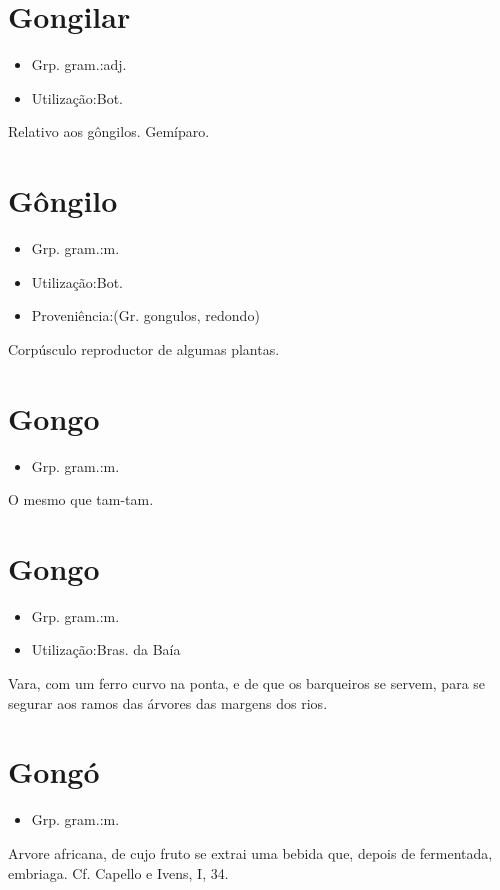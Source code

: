 \section{Gongilar}
\begin{itemize}
\item {Grp. gram.:adj.}
\end{itemize}
\begin{itemize}
\item {Utilização:Bot.}
\end{itemize}
Relativo aos gôngilos.
Gemíparo.
\section{Gôngilo}
\begin{itemize}
\item {Grp. gram.:m.}
\end{itemize}
\begin{itemize}
\item {Utilização:Bot.}
\end{itemize}
\begin{itemize}
\item {Proveniência:(Gr. \textunderscore gongulos\textunderscore , redondo)}
\end{itemize}
Corpúsculo reproductor de algumas plantas.
\section{Gongo}
\begin{itemize}
\item {Grp. gram.:m.}
\end{itemize}
O mesmo que \textunderscore tam-tam\textunderscore .
\section{Gongo}
\begin{itemize}
\item {Grp. gram.:m.}
\end{itemize}
\begin{itemize}
\item {Utilização:Bras. da Baía}
\end{itemize}
Vara, com um ferro curvo na ponta, e de que os barqueiros se servem, para se segurar aos ramos das árvores das margens dos rios.
\section{Gongó}
\begin{itemize}
\item {Grp. gram.:m.}
\end{itemize}
Arvore africana, de cujo fruto se extrai uma bebida que, depois de fermentada, embriaga. Cf. Capello e Ivens, I, 34.
